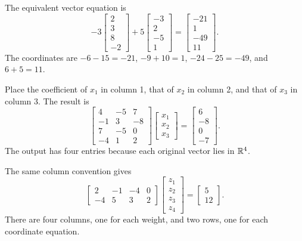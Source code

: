 The equivalent vector equation is
\[-3\begin{bmatrix}2\\3\\8\\-2\end{bmatrix}
+5\begin{bmatrix}-3\\2\\-5\\1\end{bmatrix}
=\begin{bmatrix}-21\\1\\-49\\11\end{bmatrix}.\]
The coordinates are $-6-15=-21$, $-9+10=1$, $-24-25=-49$,
and $6+5=11$.

Place the coefficient of $x_1$ in column 1, that of $x_2$ in column 2,
and that of $x_3$ in column 3. The result is
\[\begin{bmatrix}4&-5&7\\-1&3&-8\\7&-5&0\\-4&1&2\end{bmatrix}
\begin{bmatrix}x_1\\x_2\\x_3\end{bmatrix}
=\begin{bmatrix}6\\-8\\0\\-7\end{bmatrix}.\]
The output has four entries because each original vector lies in $\mathbb{R}^4$.

The same column convention gives
\[\begin{bmatrix}2&-1&-4&0\\-4&5&3&2\end{bmatrix}
\begin{bmatrix}z_1\\z_2\\z_3\\z_4\end{bmatrix}
=\begin{bmatrix}5\\12\end{bmatrix}.\]
There are four columns, one for each weight, and two rows, one for each
coordinate equation.

